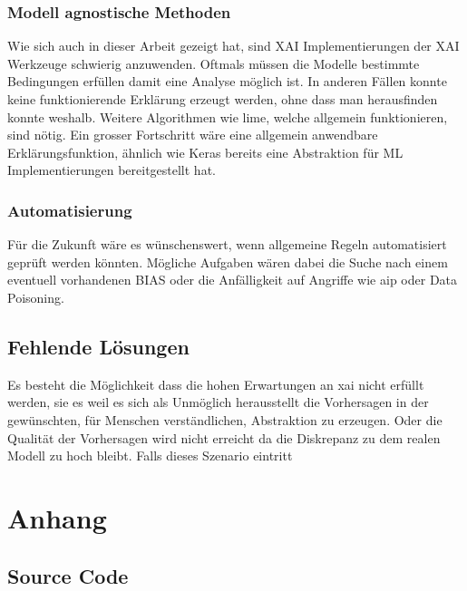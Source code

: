 \documentclass[
  12pt, %
  a4paper, %
  oneside, %
  openany, 
  numbers=noenddot, %
  BCOR=5mm, %
  parskip=half*, %
  thesis, %
]{bfhbook}
\begin{document}
\subsection{Modell agnostische Methoden}
Wie sich auch in dieser Arbeit gezeigt hat, sind \acrshort{XAI} Implementierungen der XAI Werkzeuge schwierig anzuwenden. Oftmals müssen die Modelle bestimmte Bedingungen erfüllen damit eine Analyse möglich ist. In anderen Fällen konnte keine funktionierende Erklärung erzeugt werden, ohne dass man herausfinden konnte weshalb. Weitere Algorithmen wie \acrshort{lime}, welche allgemein funktionieren, sind nötig. Ein grosser Fortschritt wäre eine allgemein anwendbare Erklärungsfunktion, ähnlich wie Keras bereits eine Abstraktion für \Gls{ML} Implementierungen bereitgestellt hat. 

\subsection{Automatisierung}
Für die Zukunft wäre es wünschenswert, wenn allgemeine Regeln automatisiert geprüft werden könnten. Mögliche Aufgaben wären dabei die Suche nach einem eventuell vorhandenen \Gls{BIAS} oder die Anfälligkeit auf Angriffe wie \acrlong{aip} oder Data Poisoning.

\section{Fehlende Lösungen}
Es besteht die Möglichkeit dass die hohen Erwartungen an \Gls{xai} nicht erfüllt werden, sie es weil es sich als Unmöglich herausstellt die Vorhersagen in der gewünschten, für Menschen verständlichen, Abstraktion zu erzeugen. Oder die Qualität der Vorhersagen wird nicht erreicht da die Diskrepanz zu dem realen Modell zu hoch bleibt. Falls dieses Szenario eintritt 
\parencite{Rudin2018}

\chapter{Anhang}
\section{Source Code}
\label{dt-vis}
\end{document}
